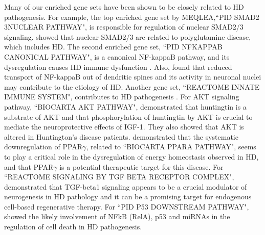 \documentclass[useAMS,usenatbib, galley]{biom}
\newcommand{\OurMethod}{MEQLEA}
\begin{document}
		
	Many of our enriched gene sets have been shown to be closely related to HD pathogenesis. For example, the top enriched gene set by \OurMethod,``PID SMAD2 3NUCLEAR PATHWAY", is responsible for regulation of nuclear SMAD2/3 signaling. \cite{katsuno2010disrupted} showed that nuclear SMAD2/3 are related to polyglutamine disease, which includes HD. The second enriched gene set, ``PID NFKAPPAB CANONICAL PATHWAY", is a canonical NF-kappaB pathway, and its dysregulation causes HD immune dysfunction \citep{trager2014htt}. Also, \cite{marcora2010huntington} found that reduced transport of NF-kappaB out of dendritic spines and its activity in neuronal nuclei may contribute to the etiology of HD. 
	Another gene set, ``REACTOME INNATE IMMUNE SYSTEM", contributes to HD pathogenesis \citep{trager2014htt, labadorf2015rna}. %
	For AKT signaling pathway, ``BIOCARTA AKT PATHWAY", \cite{humbert2002igf} demonstrated that huntingtin is a substrate of AKT and that phosphorylation of huntingtin by AKT is crucial to mediate the neuroprotective effects of IGF-1. They also showed that AKT is altered in Huntington’s disease patients.  
	\cite{chiang2010modulation} demonstrated that the systematic downregulation of PPAR$\gamma$, related to ``BIOCARTA PPARA PATHWAY", seems to play a critical role in the dysregulation of energy homeostasis observed in HD, and that PPAR$\gamma$ is a potential therapeutic target for this disease. For ``REACTOME SIGNALING BY TGF BETA RECEPTOR COMPLEX",  \cite{kandasamy2011transforming} demonstrated that TGF-beta1 signaling appears to be a crucial modulator of neurogenesis in HD pathology and it can be a promising target for endogenous cell-based regenerative therapy. 
	For ``PID P53 DOWNSTREAM PATHWAY", \cite{ghose2011regulation} showed the likely involvement of NFkB (RelA), p53 and miRNAs in the regulation of cell death in HD pathogenesis. 
	
\end{document}

